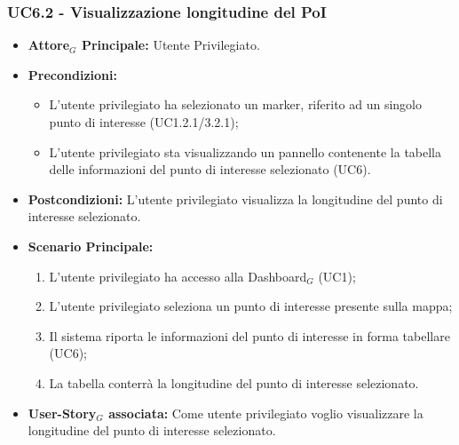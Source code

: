 \documentclass[11pt]{article}
\begin{document}
\begin{justify}
 \subsubsection{\textbf{UC6.2 - Visualizzazione longitudine del PoI}}
 \begin{itemize}
     \item \textbf{Attore$_G$ Principale:} Utente Privilegiato.
     \item \textbf{Precondizioni:}
       \begin{itemize}
    	        \item L'utente privilegiato ha selezionato un marker, riferito ad un singolo punto di interesse (UC1.2.1/3.2.1);
          \item L'utente privilegiato sta visualizzando un pannello contenente la tabella delle informazioni del punto di interesse selezionato (UC6).
       \end{itemize}
     \item \textbf{Postcondizioni:} L'utente privilegiato visualizza la longitudine del punto di interesse selezionato.
     \item \textbf{Scenario Principale:}
        \begin{enumerate}
            \item L'utente privilegiato ha accesso alla Dashboard$_G$ (UC1);
            \item L'utente privilegiato seleziona un punto di interesse presente sulla mappa;
            \item Il sistema riporta le informazioni del punto di interesse in forma tabellare (UC6);
            \item La tabella conterrà la longitudine del punto di interesse selezionato.
        \end{enumerate}
     \item \textbf{User-Story$_G$ associata:} Come utente privilegiato voglio visualizzare la longitudine del punto di interesse selezionato. 
 \end{itemize}

\end{justify}
\end{document}
